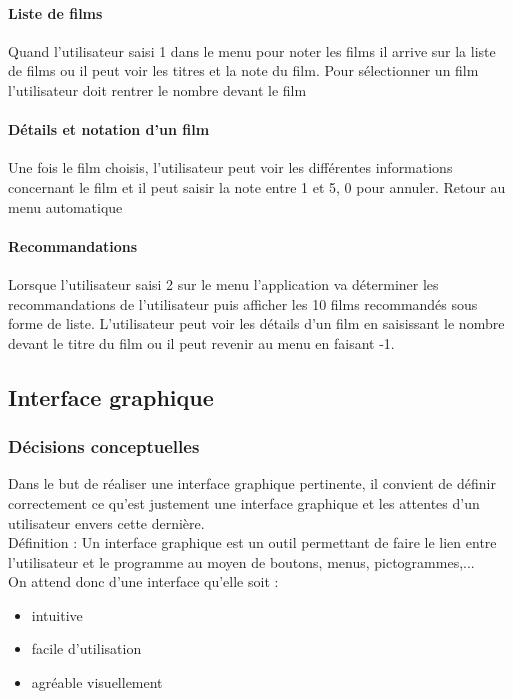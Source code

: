 \documentclass{article}
\begin{document}
\paragraph{Liste de films}
Quand l’utilisateur saisi 1 dans le menu pour noter les films il arrive sur la liste de films ou il peut voir les titres et la note du film. Pour sélectionner un film l’utilisateur doit rentrer le nombre devant le film

\paragraph{Détails et notation d'un film}
Une fois le film choisis, l’utilisateur peut voir les différentes informations concernant le film et il peut saisir la note entre 1 et 5, 0 pour annuler. Retour au menu automatique 

\paragraph{Recommandations}
Lorsque l’utilisateur saisi 2 sur le menu l’application va déterminer les recommandations de l’utilisateur puis afficher les 10 films recommandés sous forme de liste. L’utilisateur peut voir les détails d’un film en saisissant le nombre devant le titre du film ou il peut revenir au menu en faisant -1.

\subsection{Interface graphique}
\subsubsection{Décisions conceptuelles}

Dans le but de réaliser une interface graphique pertinente, il convient de définir correctement ce qu'est justement une interface graphique et les attentes d'un utilisateur envers cette dernière. \\
    
Définition : Un interface graphique est un outil permettant de faire le lien entre l'utilisateur et le programme au moyen de boutons, menus, pictogrammes,... \\
    
On attend donc d'une interface qu'elle soit :
\begin{itemize}
    \item intuitive
    \item facile d'utilisation
    \item agréable visuellement
\end{itemize}
    
\end{document}
